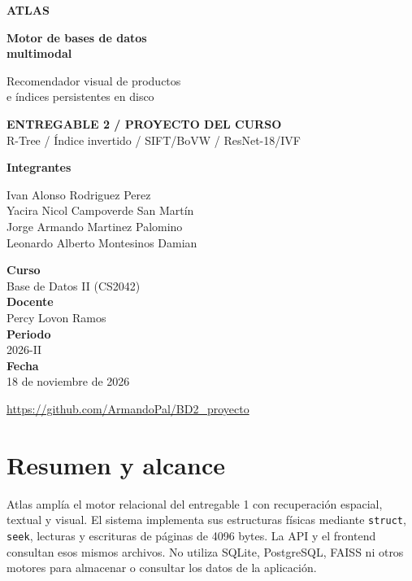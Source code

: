 \documentclass[11pt,a4paper]{article}
\newcommand{\code}[1]{\texttt{#1}}
\begin{document}
\hypersetup{pageanchor=false}
\begin{titlepage}
\vspace*{12mm}
{\color{atlas}\Large\bfseries ATLAS\par}
\vspace{17mm}
{\fontsize{32}{38}\selectfont\bfseries Motor de bases de datos\\multimodal\par}
\vspace{7mm}
{\Large Recomendador visual de productos\\e índices persistentes en disco\par}
\vspace{13mm}
\colorbox{soft}{\parbox{.91\textwidth}{\vspace{5mm}\hspace{4mm}\textcolor{atlas}{\textbf{ENTREGABLE 2 / PROYECTO DEL CURSO}}\\[3mm]\hspace{4mm}R-Tree / Índice invertido / SIFT/BoVW / ResNet-18/IVF\vspace{5mm}}}
\vfill
\begin{center}
{\large\textbf{Integrantes}\par}
\vspace{2mm}
Ivan Alonso Rodriguez Perez\\
Yacira Nicol Campoverde San Martín\\
Jorge Armando Martinez Palomino\\
Leonardo Alberto Montesinos Damian
\vspace{9mm}

\textbf{Curso}\\ Base de Datos II (CS2042)\\[3mm]
\textbf{Docente}\\ Percy Lovon Ramos\\[3mm]
\textbf{Periodo}\\ 2026-II\\[3mm]
\textbf{Fecha}\\ 18 de noviembre de 2026
\vspace{7mm}

{\small\url{https://github.com/ArmandoPal/BD2_proyecto}\par}
\end{center}
\end{titlepage}
\hypersetup{pageanchor=true}
\tableofcontents
\newpage
\section{Resumen y alcance}
Atlas amplía el motor relacional del entregable 1 con recuperación espacial, textual y visual. El sistema implementa sus estructuras físicas mediante \code{struct}, \code{seek}, lecturas y escrituras de páginas de 4096 bytes. La API y el frontend consultan esos mismos archivos. No utiliza SQLite, PostgreSQL, FAISS ni otros motores para almacenar o consultar los datos de la aplicación.
\end{document}
